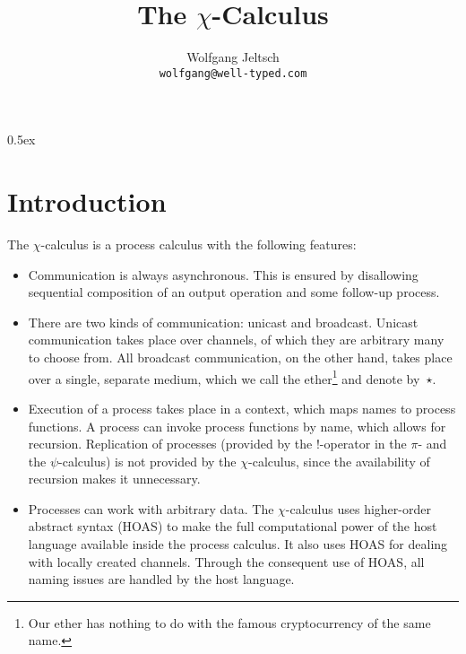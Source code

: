 \documentclass[a4paper,11pt]{article}
\begin{document}
\title{The $\chi$-Calculus}
\author{Wolfgang Jeltsch\\\small\texttt{wolfgang@well-typed.com}}

\maketitle

\tableofcontents

\parindent 0pt\parskip 0.5ex

\section{Introduction}

The $\chi$-calculus is a process calculus with the following features:
\begin{itemize}

\item

Communication is always asynchronous. This is ensured by disallowing sequential composition of an
output operation and some follow-up process.

\item

There are two kinds of communication: unicast and broadcast. Unicast communication takes place over
channels, of which they are arbitrary many to choose from. All broadcast communication, on the other
hand, takes place over a single, separate medium, which we call the ether\footnote{Our ether has
nothing to do with the famous cryptocurrency of the same name.} and denote by~$\star$.

\item

Execution of a process takes place in a context, which maps names to process functions. A process
can invoke process functions by name, which allows for recursion. Replication of processes (provided
by the $!$-operator in the $\pi$- and the $\psi$-calculus) is not provided by the $\chi$-calculus,
since the availability of recursion makes it unnecessary.

\item

Processes can work with arbitrary data. The $\chi$-calculus uses higher-order abstract syntax (HOAS)
to make the full computational power of the host language available inside the process calculus. It
also uses HOAS for dealing with locally created channels. Through the consequent use of HOAS, all
naming issues are handled by the host language.

\end{itemize}


\end{document}
